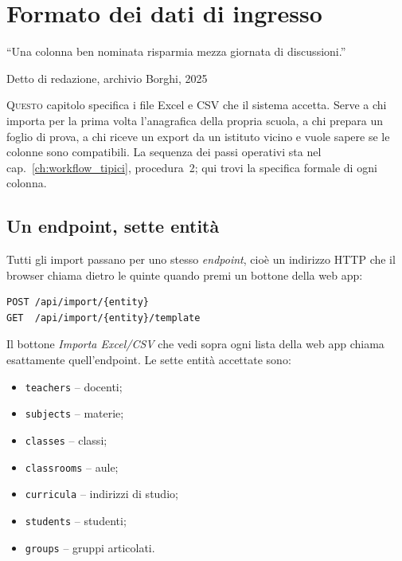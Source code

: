 \chapter{Formato dei dati di ingresso}
\label{ch:formato_dati}


\epigraph{``Una colonna ben nominata risparmia mezza giornata di
discussioni.''}{Detto di redazione, archivio Borghi, 2025}

\lettrine[lines=3]{Q}{uesto} capitolo specifica i file Excel e CSV
che il sistema accetta. Serve a chi importa per la prima volta
l'anagrafica della propria scuola, a chi prepara un foglio di
prova, a chi riceve un export da un istituto vicino e vuole
sapere se le colonne sono compatibili. La sequenza dei passi
operativi sta nel cap.~\ref{ch:workflow_tipici}, procedura~2; qui
trovi la specifica formale di ogni colonna.

\section{Un endpoint, sette entit\`a}

Tutti gli import passano per uno stesso \emph{endpoint}, cio\`e un
indirizzo HTTP che il browser chiama dietro le quinte quando
premi un bottone della web app:

\begin{lstlisting}
POST /api/import/{entity}
GET  /api/import/{entity}/template
\end{lstlisting}

Il bottone \emph{Importa Excel/CSV} che vedi sopra ogni lista
della web app chiama esattamente quell'endpoint. Le sette
entit\`a accettate sono:

\begin{itemize}
\item \texttt{teachers} -- docenti;
\item \texttt{subjects} -- materie;
\item \texttt{classes} -- classi;
\item \texttt{classrooms} -- aule;
\item \texttt{curricula} -- indirizzi di studio;
\item \texttt{students} -- studenti;
\item \texttt{groups} -- gruppi articolati.
\end{itemize}

